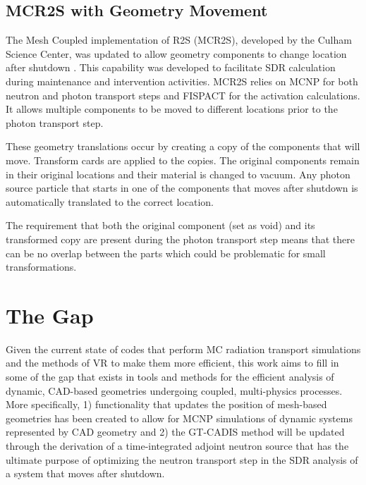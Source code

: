 
\subsection{MCR2S with Geometry Movement}
The Mesh Coupled implementation of R2S (MCR2S), developed by the Culham Science Center, 
was updated to allow geometry components to change location after shutdown
\cite{mcr2s_move}.
This capability was developed to facilitate SDR calculation during maintenance and
intervention activities.  MCR2S relies on MCNP for both neutron and photon
transport steps and FISPACT for the activation calculations. 
It allows multiple components to be moved to
different locations prior to the photon transport step.

These geometry translations occur by creating a copy of the
components that will move.  Transform cards are applied to the copies. 
The original components remain in their original locations and their material
is changed to vacuum.  Any photon source particle that starts in one of the
components that moves after shutdown is automatically translated to the correct
location. %

The requirement that both the original component (set as void) and its
transformed copy are present during the photon transport step means that there
can be no overlap between the parts which could be problematic for small
transformations.

\section{The Gap}
Given the current state of codes that perform MC radiation transport
simulations and
the methods of VR to make them more efficient, this work aims to fill in some
of the gap that exists in tools and methods for the efficient analysis of dynamic, CAD-based
geometries undergoing coupled, multi-physics processes.  More specifically, 1)
functionality that updates the position of mesh-based geometries 
has been created to allow for MCNP simulations of
dynamic systems represented by CAD geometry and 2) the GT-CADIS method will be
updated through the derivation of a time-integrated adjoint
neutron source that has the ultimate purpose of optimizing the neutron
transport step in the SDR analysis of a system that moves after shutdown.
